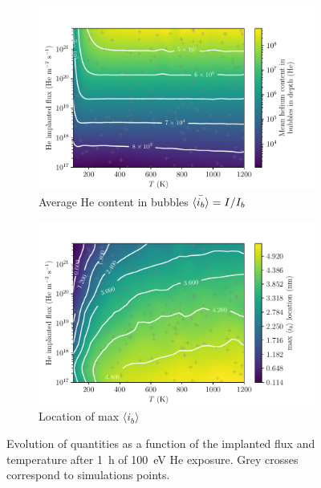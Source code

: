 \begin{figure} [ht!]
    \begin{subfigure}{0.5\linewidth}
        \centering
        \includegraphics[width=\linewidth]{Figures/Chapter4/parametric study/mean_ib_T_phi.pdf}
        \caption{Average He content in bubbles $\Bar{\langle i_b \rangle} = I / I_b$}
    \end{subfigure}%
    \begin{subfigure}{0.5\linewidth}
        \centering
        \includegraphics[width=\linewidth]{Figures/Chapter4/parametric study/x_max_ib_T_phi.pdf}
        \caption{Location of max $\langle i_b \rangle$}
    \end{subfigure}
    \caption{Evolution of quantities as a function of the implanted flux and temperature after \SI{1}{h} of \SI{100}{eV} He exposure. Grey crosses correspond to simulations points.}
\end{figure}

